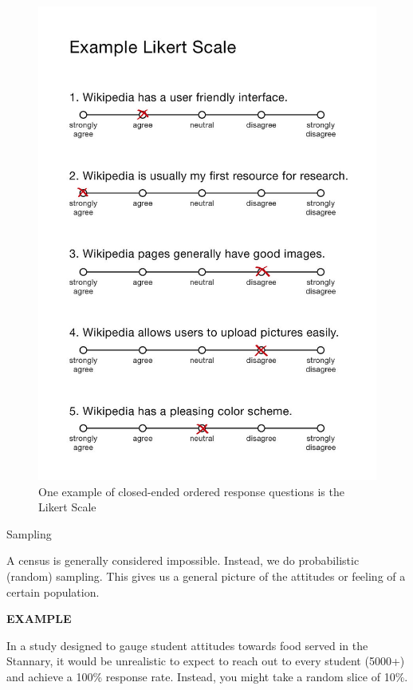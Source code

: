 \documentclass[ignorenonframetext,]{beamer}
\begin{document}
\begin{frame}{}

\begin{figure}
\centering
\includegraphics{assets/likert.jpg}
\caption{One example of closed-ended ordered response questions is the
Likert Scale}
\end{figure}

\end{frame}

\begin{frame}{Sampling}

A census is generally considered impossible. Instead, we do
probabilistic (random) sampling. This gives us a general picture of the
attitudes or feeling of a certain population.

\textbf{EXAMPLE}

In a study designed to gauge student attitudes towards food served in
the Stannary, it would be unrealistic to expect to reach out to every
student (5000+) and achieve a 100\% response rate. Instead, you might
take a random slice of 10\%.

\end{frame}
\end{document}
